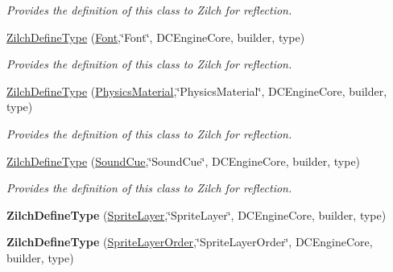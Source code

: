 \begin{DoxyCompactItemize}
\begin{DoxyCompactList}\small\item\em Provides the definition of this class to Zilch for reflection. \end{DoxyCompactList}\item 
\hypertarget{namespaceDCEngine_a87e63ae885fc043c27e4e8b6c261fb7e}{\hyperlink{namespaceDCEngine_a87e63ae885fc043c27e4e8b6c261fb7e}{Zilch\-Define\-Type} (\hyperlink{classDCEngine_1_1Font}{Font},\char`\"{}Font\char`\"{}, D\-C\-Engine\-Core, builder, type)}\label{namespaceDCEngine_a87e63ae885fc043c27e4e8b6c261fb7e}

\begin{DoxyCompactList}\small\item\em Provides the definition of this class to Zilch for reflection. \end{DoxyCompactList}\item 
\hypertarget{namespaceDCEngine_a4a2e4c5b092beb0f178b0cd882247279}{\hyperlink{namespaceDCEngine_a4a2e4c5b092beb0f178b0cd882247279}{Zilch\-Define\-Type} (\hyperlink{classDCEngine_1_1PhysicsMaterial}{Physics\-Material},\char`\"{}Physics\-Material\char`\"{}, D\-C\-Engine\-Core, builder, type)}\label{namespaceDCEngine_a4a2e4c5b092beb0f178b0cd882247279}

\begin{DoxyCompactList}\small\item\em Provides the definition of this class to Zilch for reflection. \end{DoxyCompactList}\item 
\hypertarget{namespaceDCEngine_a1fb7e068351dd85d8154d3e8e992c386}{\hyperlink{namespaceDCEngine_a1fb7e068351dd85d8154d3e8e992c386}{Zilch\-Define\-Type} (\hyperlink{classDCEngine_1_1SoundCue}{Sound\-Cue},\char`\"{}Sound\-Cue\char`\"{}, D\-C\-Engine\-Core, builder, type)}\label{namespaceDCEngine_a1fb7e068351dd85d8154d3e8e992c386}

\begin{DoxyCompactList}\small\item\em Provides the definition of this class to Zilch for reflection. \end{DoxyCompactList}\item 
\hypertarget{namespaceDCEngine_a163fe00911ccd5cbfb89d9f81bfd8caf}{{\bfseries Zilch\-Define\-Type} (\hyperlink{classDCEngine_1_1SpriteLayer}{Sprite\-Layer},\char`\"{}Sprite\-Layer\char`\"{}, D\-C\-Engine\-Core, builder, type)}\label{namespaceDCEngine_a163fe00911ccd5cbfb89d9f81bfd8caf}

\item 
\hypertarget{namespaceDCEngine_a0272c9d5cd21095b210a595505193fb0}{{\bfseries Zilch\-Define\-Type} (\hyperlink{classDCEngine_1_1SpriteLayerOrder}{Sprite\-Layer\-Order},\char`\"{}Sprite\-Layer\-Order\char`\"{}, D\-C\-Engine\-Core, builder, type)}\label{namespaceDCEngine_a0272c9d5cd21095b210a595505193fb0}


\end{DoxyCompactItemize}

